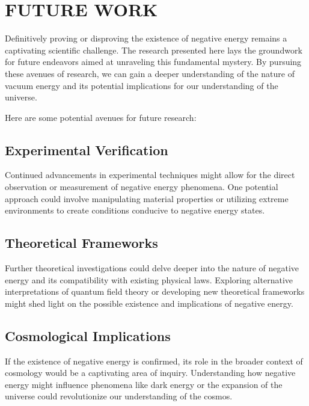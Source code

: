 \section{FUTURE WORK}

Definitively proving or disproving the existence of negative energy remains a captivating scientific challenge. 
The research presented here lays the groundwork for future endeavors aimed at unraveling this fundamental mystery. 
By pursuing these avenues of research, we can gain a deeper understanding of the nature 
of vacuum energy and its potential implications for our understanding of the universe.

Here are some potential avenues for future research:
\subsection*{Experimental Verification} 
    Continued advancements in experimental techniques might allow for the direct observation 
    or measurement of negative energy phenomena. 
    One potential approach could involve manipulating material properties or utilizing extreme environments 
    to create conditions conducive to negative energy states.
\subsection*{Theoretical Frameworks} 
    Further theoretical investigations could delve deeper into the nature of negative energy and 
    its compatibility with existing physical laws. 
    Exploring alternative interpretations of quantum field theory or developing new theoretical 
    frameworks might shed light on the possible existence and implications of negative energy.
\subsection*{Cosmological Implications} 
    If the existence of negative energy is confirmed, 
    its role in the broader context of cosmology would be a captivating area of inquiry. 
    Understanding how negative energy might influence phenomena like dark energy or the expansion of 
    the universe could revolutionize our understanding of the cosmos.
